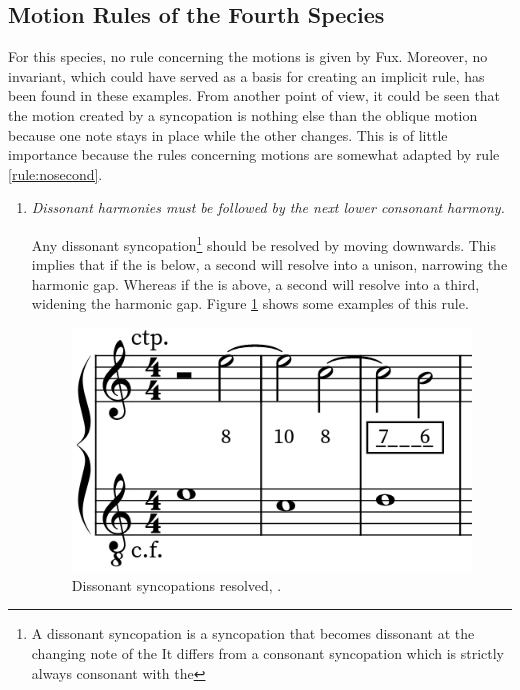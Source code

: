 \subsection{Motion Rules of the Fourth Species}
For this species, no rule concerning the motions is given by Fux. Moreover, no invariant, which could have served as a basis for creating an implicit rule, has been found in these examples. From another point of view, it could be seen that the motion created by a syncopation is nothing else than the oblique motion because one note stays in place while the other changes. This is of little importance because the rules concerning motions are somewhat adapted by rule \ref{rule:nosecond}.
\begin{enumerate}[wide, label=\bfseries 4.P\arabic*]
    \item\label{rule:dissolved} \textit{Dissonant harmonies must be followed by the next lower consonant harmony.} \textcite[p.78-81]{GaPFr}

    Any dissonant syncopation\footnote{A dissonant syncopation is a syncopation that becomes dissonant at the changing note of the \cfdot It differs from a consonant syncopation which is strictly always consonant with the \cfdot} should be resolved by moving downwards. This implies that if the \cf is below, a second will resolve into a unison, narrowing the harmonic gap. Whereas if the \cf is above, a second will resolve into a third, widening the harmonic gap. Figure \ref{fig:dissonantdown} shows some examples of this rule.

    \begin{figure}[h]
        \centering
        \includegraphics[height=\fh]{Images/dissonance_resolved.png}
        \caption{Dissonant syncopations resolved, .}
        \label{fig:dissonantdown}
    \end{figure}


\end{enumerate}

